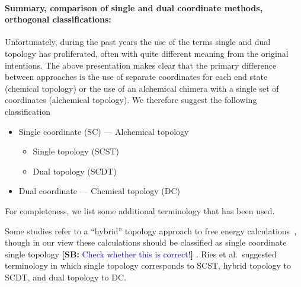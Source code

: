 \documentclass[9pt,bestpractices]{livecoms}
\newcommand{\sbnote}[1]{%
  {\bfseries{}[SB: }%
  {\textcolor{blue}{#1}}{\bfseries{}]}
}
\begin{document}

\paragraph{Summary, comparison of single and dual coordinate methods, orthogonal classifications:}


Unfortunately, during the past years the use of the terms single and dual topology has proliferated, often with quite different meaning from the original intentions. The above presentation makes clear that the primary difference between approaches is the use of separate coordinates for each end state (chemical topology) or the use of an alchemical chimera with a single set of coordinates (alchemical topology). We therefore suggest the following classification
\begin{itemize}
\item Single coordinate (SC) --- Alchemical topology
  \begin{itemize}
  \item Single topology (SCST)
    \item Dual topology (SCDT)
  \end{itemize}
  \item Dual coordinate --- Chemical topology (DC)
  \end{itemize}
For completeness, we list some additional terminology that has been used.

Some studies refer to a ``hybrid'' topology approach to free energy calculations~\cite{gapsys2015pmx, gapsys2016accurate, gapsys2020large}, though in our view these calculations should be classified as single coordinate single topology \sbnote{Check whether this is correct!}. %
Ries et al.\ suggested terminology \cite{Ries_2022} in which single topology corresponds to SCST, hybrid topology to SCDT, and dual topology to DC.
\end{document}
